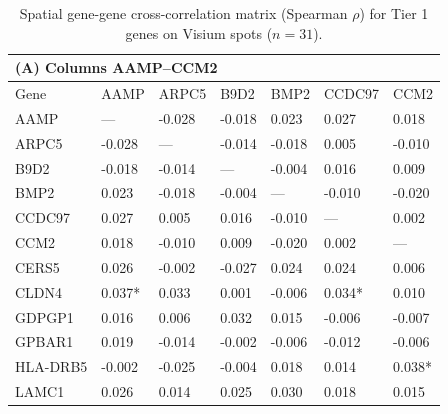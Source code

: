 \begin{table}[htbp]
\centering
\caption{Spatial gene-gene cross-correlation matrix (Spearman $\rho$) for Tier 1 genes on Visium spots ($n=31$).}\label{tab:spatial_crosscorr}
\small
\begin{tabular}{lllllll}
\toprule
\multicolumn{7}{l}{\textbf{(A)} Columns AAMP--CCM2}\\
\midrule
  Gene & AAMP & ARPC5 & B9D2 & BMP2 & CCDC97 & CCM2 \\
\midrule
  AAMP     & ---    & -0.028 & -0.018 & 0.023  & 0.027  & 0.018 \\
  ARPC5    & -0.028 & ---    & -0.014 & -0.018 & 0.005  & -0.010 \\
  B9D2     & -0.018 & -0.014 & ---    & -0.004 & 0.016  & 0.009 \\
  BMP2     & 0.023  & -0.018 & -0.004 & ---    & -0.010 & -0.020 \\
  CCDC97   & 0.027  & 0.005  & 0.016  & -0.010 & ---    & 0.002 \\
  CCM2     & 0.018  & -0.010 & 0.009  & -0.020 & 0.002  & --- \\
  CERS5    & 0.026  & -0.002 & -0.027 & 0.024  & 0.024  & 0.006 \\
  CLDN4    & 0.037* & 0.033  & 0.001  & -0.006 & 0.034* & 0.010 \\
  GDPGP1   & 0.016  & 0.006  & 0.032  & 0.015  & -0.006 & -0.007 \\
  GPBAR1   & 0.019  & -0.014 & -0.002 & -0.006 & -0.012 & -0.006 \\
  HLA-DRB5 & -0.002 & -0.025 & -0.004 & 0.018  & 0.014  & 0.038* \\
  LAMC1    & 0.026  & 0.014  & 0.025  & 0.030  & 0.018  & 0.015 \\
\bottomrule
\end{tabular}

\vspace{1.4em}


\end{table}
